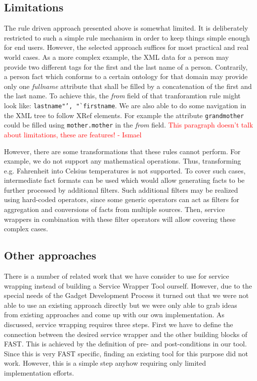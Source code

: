 \documentclass{fast_latex}
\begin{document}

\subsection{Limitations} %
\label{sub:limitations}

The rule driven approach presented above is somewhat limited. It is deliberately restricted to such a simple rule mechanism in order to keep things simple enough for end users. However, the selected approach suffices for most practical and real world cases. As a more complex example, the XML data for a person may provide two different tags for the first and the last name of a person. Contrarily, a person fact which conforms to a certain ontology for that domain may provide only one \emph{fullname} attribute that shall be filled by a concatenation of the first and the last name. To achieve this, the \textit{from} field of that tranforamtion rule might look like: \texttt{lastname"', "`firstname}. We are also able to do some navigation in the XML tree to follow XRef elements. For example the attribute \texttt{grandmother} could be filled using \texttt{mother.mother} in the \textit{from} field.
\textcolor{red}{This paragraph doesn't talk about limitations, these are features! - Ismael} 

However, there are some transformations that these rules cannot perform. For example, we do not support any mathematical operations. Thus, transforming e.g. Fahrenheit into Celsius temperatures is not supported. To cover such cases, intermediate fact formats can be used which would allow generating facts to be further processed by additional filters. Such additional filters may be realized using hard-coded operators, since some generic operators can act as filters for aggregation and conversions of facts from multiple sources. Then, service wrappers in combination with these filter operators will allow covering these complex cases.


\subsection{Other approaches} %
\label{sub:other_approaches}

There is a number of related work that we have consider to use for service wrapping instead of building a Service Wrapper
Tool ourself. However, due to the special needs of the Gadget Development Process it turned out that we were not able 
to use an existing approach directly but we were only able to grab ideas from existing approaches and come up with our own implementation. 
As discussed, service wrapping requires three steps. First we have to define the connection between the desired service wrapper and the other building blocks of FAST. This is achieved by the definition of pre- and post-conditions in our tool. Since this is very FAST specific, finding an existing tool for this purpose did not work. However, this is a simple step anyhow requiring only limited implementation efforts. 
\end{document}
